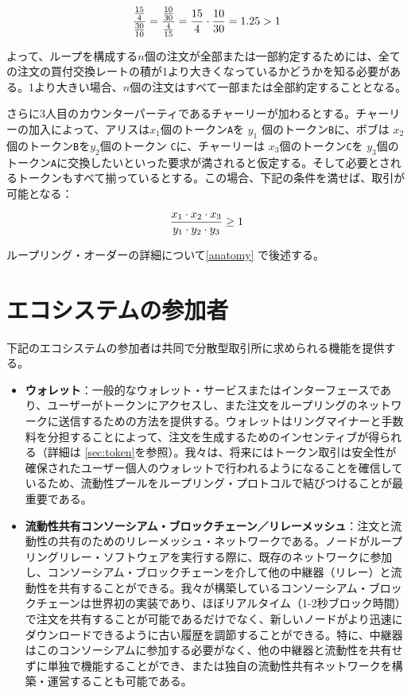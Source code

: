 \documentclass{article}
\begin{document}
\begin{multicols}{2}
\begin{equation}
{{15\over 4} \over {30\over 10}} = {{10\over 30} \over {4\over 15}}={15 \over 4} \cdot {10 \over 30} = 1.25 > 1
\end{equation}
  
よって、ループを構成する$n$個の注文が全部または一部約定するためには、全ての注文の買付交換レートの積が1より大きくなっているかどうかを知る必要がある。1より大きい場合、$n$個の注文はすべて一部または全部約定することとなる\cite{supersymmetry}。

さらに3人目のカウンターパーティであるチャーリーが加わるとする。チャーリーの加入によって、アリスは$x_1$個のトークン\verb|A|を $y_1$ 個のトークン\verb|B|に、ボブは $x_2$個のトークン\verb|B|を$y_2$個のトークン \verb|C|に、チャーリーは $x_3$個のトークン\verb|C|を $y_3$個のトークン\verb|A|に交換したいといった要求が満されると仮定する。そして必要とされるトークンもすべて揃っているとする。この場合、下記の条件を満せば、取引が可能となる：

\begin{equation}
{{x_1 \cdot x_2 \cdot x_3 \over y_1 \cdot y_2 \cdot y_3} \geq 1}
\end{equation}

ループリング・オーダーの詳細について\ref{anatomy} で後述する。



\section{エコシステムの参加者\label{sec:ecosystem}}
下記のエコシステムの参加者は共同で分散型取引所に求められる機能を提供する。

\begin{itemize}

\item \textbf{ウォレット}：一般的なウォレット・サービスまたはインターフェースであり、ユーザーがトークンにアクセスし、また注文をループリングのネットワークに送信するための方法を提供する。ウォレットはリングマイナーと手数料を分担することによって、注文を生成するためのインセンティブが得られる（詳細は \ref{sec:token}を参照）。我々は、将来にはトークン取引は安全性が確保されたユーザー個人のウォレットで行われるようになることを確信しているため、流動性プールをループリング・プロトコルで結びつけることが最重要である。

\item \textbf{流動性共有コンソーシアム・ブロックチェーン／リレーメッシュ}：注文と流動性の共有のためのリレーメッシュ・ネットワークである。ノードがループリングリレー・ソフトウェアを実行する際に、既存のネットワークに参加し、コンソーシアム・ブロックチェーンを介して他の中継器（リレー）と流動性を共有することができる。我々が構築しているコンソーシアム・ブロックチェーンは世界初の実装であり、ほぼリアルタイム（1-2秒ブロック時間）で注文を共有することが可能であるだけでなく、新しいノードがより迅速にダウンロードできるように古い履歴を調節することができる。特に、中継器はこのコンソーシアムに参加する必要がなく、他の中継器と流動性を共有せずに単独で機能することができ、または独自の流動性共有ネットワークを構築・運営することも可能である。


\end{itemize}
\end{multicols}
\end{document}
